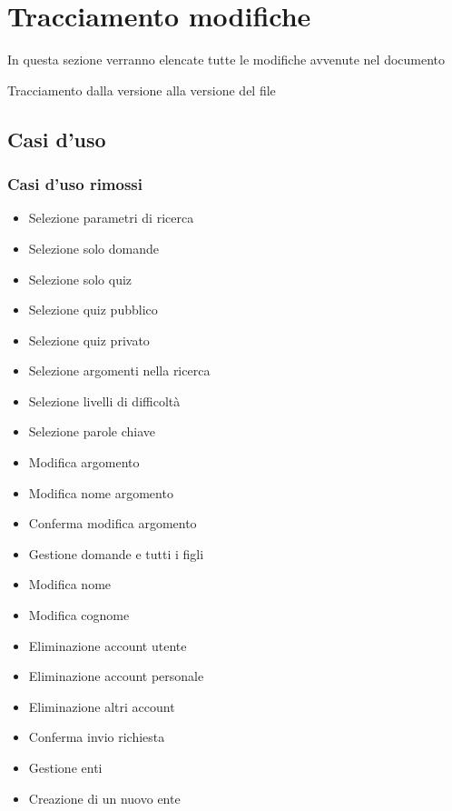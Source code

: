 \section{Tracciamento modifiche}
In questa sezione verranno elencate tutte le modifiche avvenute nel documento

Tracciamento dalla versione  alla versione  del file 

\subsection{Casi d'uso}
\subsubsection{Casi d'uso rimossi}
\begin{itemize}
	\item {} Selezione parametri di ricerca 
	\item {} Selezione solo domande
	\item {} Selezione solo quiz
	\item {} Selezione quiz pubblico
	\item {} Selezione quiz privato
	\item {} Selezione argomenti nella ricerca
	\item {} Selezione livelli di difficoltà
	\item {} Selezione parole chiave
	\item {} Modifica argomento
	\item {} Modifica nome argomento 
	\item {} Conferma modifica argomento
	\item {} Gestione domande e tutti i figli
	\item {} Modifica nome
	\item {} Modifica cognome
	\item {} Eliminazione account utente
	\item {} Eliminazione account personale
	\item {} Eliminazione altri account
	\item {} Conferma invio richiesta 
	\item {} Gestione enti 
	\item {} Creazione di un nuovo ente

\end{itemize}
